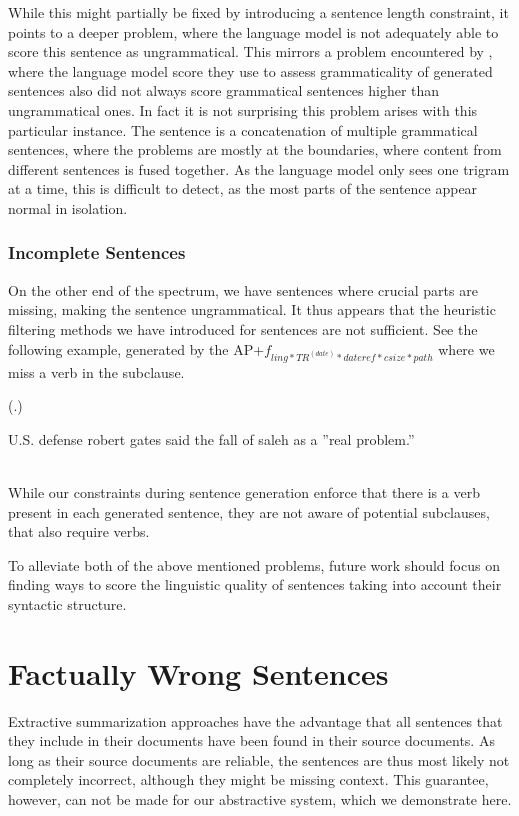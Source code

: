 \documentclass[a4paper,BCOR=10mm]{report}
\newcounter{quotecount}[chapter]
\newcommand{\countquotenosource}[1]{\vspace{1cm}\refstepcounter{quotecount}%
     (\thechapter.\arabic{quotecount}) \hspace*{1cm} \parbox{9cm}{#1}\\[1cm]}
\numberwithin{lemma}{chapter}
\numberwithin{definition}{chapter}
\begin{document}
While this might partially be fixed by introducing a sentence length constraint, it points to a deeper problem, where the language model is not adequately able to score this sentence as ungrammatical.
This mirrors a problem encountered by \citet{mckeown}, where the language model score they use to assess grammaticality of generated sentences also did not always score grammatical sentences higher than ungrammatical ones. In fact it is not surprising this problem arises with this particular instance. The sentence is a concatenation of multiple grammatical sentences, where the problems are mostly at the boundaries, where content from different sentences is fused together. As the language model only sees one trigram at a time, this is difficult to detect, as the most parts of the sentence appear normal in isolation.

\subsubsection{Incomplete Sentences}

On the other end of the spectrum, we have sentences where crucial parts are missing, making the sentence ungrammatical. It thus appears that the heuristic filtering methods we have introduced for sentences are not sufficient.
See the following example, generated by the AP+$f_{ ling*TR^{(date)}*\mathit{dateref}*\mathit{csize}*\mathit{path} }$ where we miss a verb in the subclause.

\countquotenosource{
    U.S. defense robert gates said the fall of saleh as a ''real problem.''
}

While our constraints during sentence generation enforce that there is a verb present in each generated sentence, they are not aware of potential subclauses, that also require verbs.

To alleviate both of the above mentioned problems, future work should focus on finding ways to score the linguistic quality of sentences taking into account their syntactic structure.

\section{Factually Wrong Sentences}

Extractive summarization approaches have the advantage that all sentences that they include in their documents have been found in their source documents. As long as their source documents are reliable, the sentences are thus most likely not completely incorrect, although they might be missing context.
This guarantee, however, can not be made for our abstractive system, which we demonstrate here.
\end{document}
